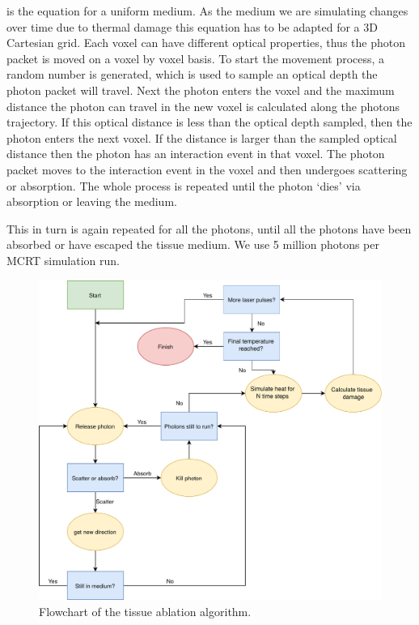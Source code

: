  is the equation for a uniform medium. As the medium we are simulating changes over time due to thermal damage this equation has to be adapted for a 3D Cartesian grid. Each voxel 
can have different optical properties, thus the photon packet is moved on a voxel by voxel basis. To start the movement process, a random number is generated, which is used to sample an optical depth the photon packet will travel. Next the photon enters the voxel and the maximum distance the photon can travel in the new voxel is calculated along the photons trajectory. If this optical distance is less than the optical depth sampled, then the photon enters the next voxel. If the distance is larger than the sampled optical distance then the photon has an interaction event in that voxel. The photon packet moves to the interaction event in the voxel and then undergoes scattering or absorption. The whole process is repeated until the photon `dies' via absorption or leaving the medium.

This in turn is again repeated for all the photons, until all the photons have been absorbed or have escaped the tissue medium. We use 5 million photons per MCRT simulation run.\\

\begin{figure}
\centering
\includegraphics[scale=0.5]{./ablation/images/flowchart.pdf}
\caption{Flowchart of the tissue ablation algorithm.}
\label{fig:algo}
\end{figure}

